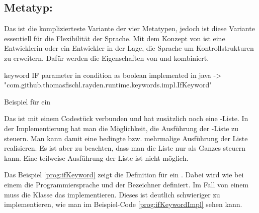 
\subsection{Metatyp: }

Das  ist die komplizierteste Variante der vier Metatypen, jedoch ist diese Variante essentiell für die Flexibilität der Sprache. Mit dem Konzept von  ist eine Entwicklerin oder ein Entwickler in der Lage, die Sprache um Kontrollstrukturen zu erweitern. Dafür werden die Eigenschaften von  und  kombiniert. 

\begin{program}
\begin{JavaCode}
keyword IF { 
	parameter in condition as boolean
	implemented in java -> "com.github.thomasfischl.rayden.runtime.keywords.impl.IfKeyword"
}
\end{JavaCode}
\caption{Beispiel für ein }
\label{prog:ifKeyword}
\end{program}

\SuperPar
Das  ist mit einem Codestück verbunden und hat zusätzlich noch eine -Liste. In der Implementierung hat man die Möglichkeit, die Ausführung der -Liste zu steuern. Man kann damit eine bedingte bzw. mehrmalige Ausführung der Liste realisieren. Es ist aber zu beachten, dass man die Liste nur als Ganzes steuern kann. Eine teilweise Ausführung der Liste ist nicht möglich.

\SuperPar
Das Beispiel \ref{prog:ifKeyword} zeigt die Definition für ein . Dabei wird wie bei einem  die Programmiersprache und der Bezeichner definiert. Im Fall von einem  muss die Klasse das   implementieren. Dieses  ist deutlich schwieriger zu implementieren, wie man im Beispiel-Code \ref{prog:ifKeywordImpl} sehen kann.

